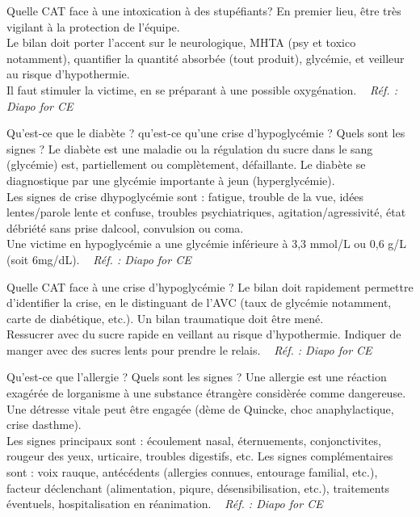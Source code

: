 \documentclass[grid,avery5371,landscape]{flashcards}
\makeatletter
\newcounter{nocarte}
\newcommand{\categ}[1]{%
  \def\@categ{#1}%
  \setcounter{nocarte}{0}%
}
\newcommand{\source}[1]{%
  \medskip
  \itshape%
   ~ \hfill Réf. : #1}
\makeatother
\begin{document}
\color[HTML]{01DF01}
\categ{CE-CP-REG}
\begin{flashcard}[CAT]{
 Quelle CAT face à une intoxication à des stupéfiants?   }
  En premier lieu, être très vigilant à la protection de l'équipe. \\
    Le bilan doit porter l'accent sur le neurologique, MHTA (psy et toxico notamment), quantifier la quantité absorbée (tout produit), glycémie, et veilleur au risque d'hypothermie. \\
    Il faut stimuler la victime, en se préparant à une possible oxygénation.
  \source{Diapo for CE }
\end{flashcard}


\color[HTML]{01DF01}
\categ{CE-CP-REG}
\begin{flashcard}[bilan]{
 Qu'est-ce que le diabète ? qu'est-ce qu'une crise d'hypoglycémie ? Quels sont les signes ?   }
  Le diabète est une maladie ou la régulation du sucre dans le sang (glycémie) est, partiellement ou complètement, défaillante. Le diabète se diagnostique par une glycémie importante à jeun (hyperglycémie). \\
    Les signes de crise dhypoglycémie sont : fatigue, trouble de la vue, idées lentes/parole lente et confuse, troubles psychiatriques, agitation/agressivité, état débriété sans prise dalcool, convulsion ou coma.\\
    Une victime en hypoglycémie a une glycémie inférieure à 3,3 mmol/L ou 0,6 g/L (soit 6mg/dL).
  \source{Diapo for CE }
\end{flashcard}


\color[HTML]{01DF01}
\categ{CE-CP-REG}
\begin{flashcard}[CAT]{
 Quelle CAT face à une crise d'hypoglycémie ?   }
  Le bilan doit rapidement permettre d'identifier la crise, en le distinguant de l'AVC (taux de glycémie notamment, carte de diabétique, etc.). Un bilan traumatique doit être mené. \\
    Ressucrer avec du sucre rapide en veillant au risque d'hypothermie. Indiquer de manger avec des sucres lents pour prendre le relais.
  \source{Diapo for CE }
\end{flashcard}


\color[HTML]{01DF01}
\categ{CE-CP-REG}
\begin{flashcard}[bilan]{
 Qu'est-ce que l'allergie ? Quels sont les signes ?   }
  Une allergie est une réaction exagérée de lorganisme à une substance étrangère considèrée comme dangereuse. Une détresse vitale peut être engagée (dème de Quincke, choc anaphylactique, crise dasthme). \\
Les signes principaux sont : écoulement nasal, éternuements, conjonctivites, rougeur des yeux, urticaire, troubles digestifs, etc. Les signes complémentaires sont : voix rauque, antécédents (allergies connues, entourage familial, etc.), facteur déclenchant (alimentation, piqure, désensibilisation, etc.), traitements éventuels, hospitalisation en réanimation.
  \source{Diapo for CE }
\end{flashcard}
\end{document}
